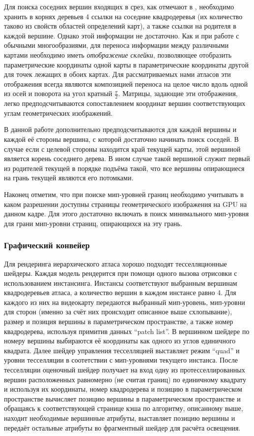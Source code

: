 \documentclass[12pt]{extarticle}
\begin{document}
Для поиска соседних вершин входящих в срез, как отмечают в \cite{niski2007multi}, необходимо хранить в корнях деревьев 4 ссылки на соседние квадродеревья (их количество таково из свойств областей определений карт), а также ссылки на родителя в каждой вершине. Однако этой информации не достаточно. Как и при работе с обычными многообразиями, для переноса информации между различными картами необходимо иметь \emph{отображение склейки}, позволяющее отобразить параметрические координаты одной карты в параметрические координаты другой для точек лежащих в обоих картах. Для рассматриваемых нами атласов эти отображения всегда являются композицией переноса на целое число вдоль одной из осей и поворота на угол кратный $\frac{\pi}{2}$. Матрицы, задающие эти отображения, легко предподсчитываются сопоставлением координат вершин соответствующих углам геометрических изображений.

В данной работе дополнительно предподсчитываются для каждой вершины и каждой её стороны вершина, с которой достаточно начинать поиск соседей. В случае если с целевой стороны находится край текущей карты, этой вершиной является корень соседнего дерева. В ином случае такой вершиной служит первый из родителей текущей в порядке подъёма такой, что все вершины опирающиеся на грань текущей являются его потомками.

Наконец отметим, что при поиске мип-уровней границ необходимо учитывать в каком разрешении доступны страницы геометрического изображения на GPU на данном кадре. Для этого достаточно включать в поиск минимального мип-уровня для грани мип-уровни страниц, опирающихся на эту грань.

\subsubsection{Графический конвейер}
Для рендеринга иерархического атласа хорошо подходят тесселляционные шейдеры. Каждая модель рендерится при помощи одного вызова отрисовки с использованием инстансинга. Инстансы соответствуют выбранным вершинам квадродеревьев атласа, а количество вершин в каждом инстансе равно 4. Для каждого из них на видеокарту передаются выбранный мип-уровень, мип-уровни для сторон (именно за счёт них происходит описанное выше схлопывание), размер и позиция вершины в параметрическом пространстве, а также номер квадродерева, используя примитив данных ``patch list''. В вершинном шейдере по номеру вершины выбираются её координаты как одного из углов единичного квадрата. Далее шейдер управления тесселляцией выставляет режим ``quad'' и уровни тесселляции в соотетствии с мип-уровнями текущего инстанса. После тесселляции оценочный шейдер получает на вход одну из протесселлированных вершин расположенных равномерно (не считая границ) по единичному квадрату и используя их координаты, номер квадродерева и позицию в параметрическом пространстве вычисляет позицию вершины в параметрическом пространстве и обращаясь к соответствующей странице кэша по алгоритму, описанному выше, находит необходимые вершинные атрибуты, выставляет позицию вершины и передаёт остальные атрибуты во фрагментный шейдер для расчёта освещения.
\end{document}
